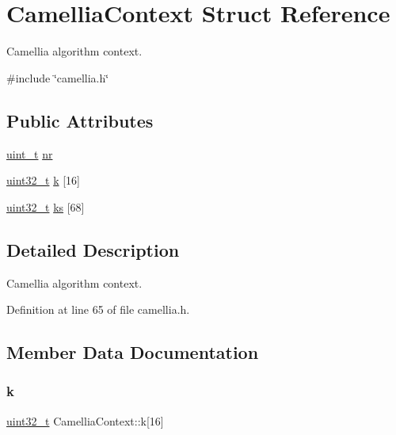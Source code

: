 \hypertarget{structCamelliaContext}{}\section{Camellia\+Context Struct Reference}
\label{structCamelliaContext}


Camellia algorithm context.  




{\ttfamily \#include \char`\"{}camellia.\+h\char`\"{}}

\subsection*{Public Attributes}
\begin{DoxyCompactItemize}
\item 
\hyperlink{compiler__port_8h_a12a1e9b3ce141648783a82445d02b58d}{uint\+\_\+t} \hyperlink{structCamelliaContext_a53fbc3b3b523fcf86ec2fb13690c4c5e}{nr}
\item 
\hyperlink{stdint_8h_a435d1572bf3f880d55459d9805097f62}{uint32\+\_\+t} \hyperlink{structCamelliaContext_a0ced10c17db7c88b9be722699cfffffa}{k} \mbox{[}16\mbox{]}
\item 
\hyperlink{stdint_8h_a435d1572bf3f880d55459d9805097f62}{uint32\+\_\+t} \hyperlink{structCamelliaContext_a462c7479aab6b5e6a3646ab1b0eb6f6c}{ks} \mbox{[}68\mbox{]}
\end{DoxyCompactItemize}


\subsection{Detailed Description}
Camellia algorithm context. 

Definition at line 65 of file camellia.\+h.



\subsection{Member Data Documentation}
\mbox{\label{structCamelliaContext_a0ced10c17db7c88b9be722699cfffffa}} 
\subsubsection{\texorpdfstring{k}{k}}
{\footnotesize\ttfamily \hyperlink{stdint_8h_a435d1572bf3f880d55459d9805097f62}{uint32\+\_\+t} Camellia\+Context\+::k\mbox{[}16\mbox{]}}



